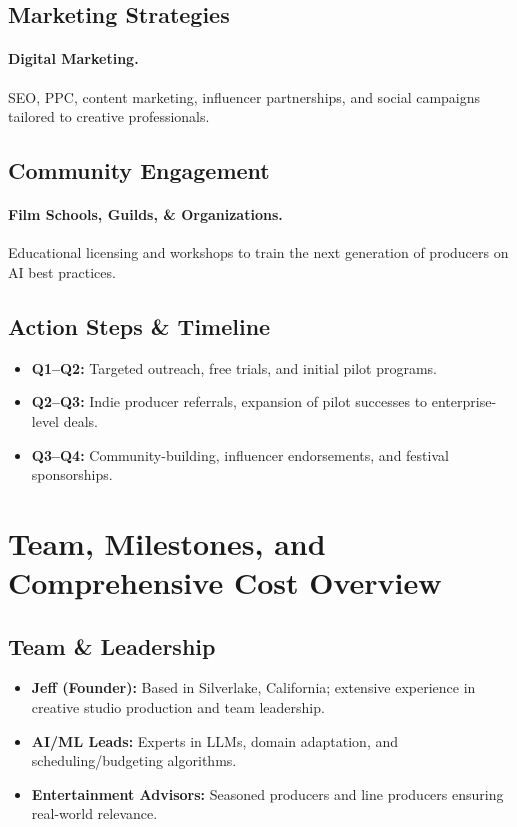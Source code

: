 \documentclass[11pt]{article}
\begin{document}
\subsection{Marketing Strategies}
\paragraph{Digital Marketing.} SEO, PPC, content marketing, influencer partnerships, and social campaigns tailored to creative professionals.

\subsection{Community Engagement}
\paragraph{Film Schools, Guilds, \& Organizations.} Educational licensing and workshops to train the next generation of producers on AI best practices.

\subsection{Action Steps \& Timeline}
\begin{itemize}
    \item \textbf{Q1--Q2:} Targeted outreach, free trials, and initial pilot programs.
    \item \textbf{Q2--Q3:} Indie producer referrals, expansion of pilot successes to enterprise-level deals.
    \item \textbf{Q3--Q4:} Community-building, influencer endorsements, and festival sponsorships.
\end{itemize}

\section{Team, Milestones, and Comprehensive Cost Overview}

\subsection{Team \& Leadership}
\begin{itemize}
    \item \textbf{Jeff (Founder):} Based in Silverlake, California; extensive experience in creative studio production and team leadership.
    \item \textbf{AI/ML Leads:} Experts in LLMs, domain adaptation, and scheduling/budgeting algorithms.
    \item \textbf{Entertainment Advisors:} Seasoned producers and line producers ensuring real-world relevance.
\end{itemize}
\end{document}
